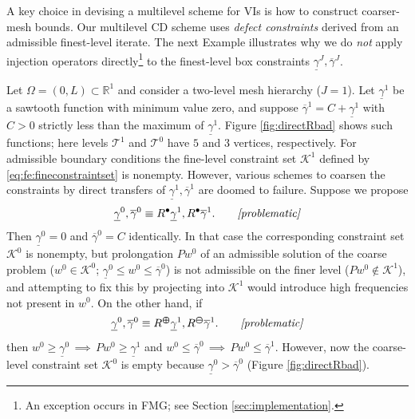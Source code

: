 \documentclass[review,hidelinks,onefignum,onetabnum]{siamart220329}
\newcommand{\RR}{\mathbb{R}}
\newcommand{\maxR}{R^{\bm{\oplus}}}
\newcommand{\minR}{R^{\bm{\ominus}}}
\newcommand{\iR}{R^{\bullet}}
\begin{document}
A key choice in devising a multilevel scheme for VIs is how to construct coarser-mesh bounds.
Our multilevel CD scheme uses \emph{defect constraints} \cite{GraeserKornhuber2009} derived from an admissible finest-level iterate.  The next Example illustrates why we do \emph{not} apply injection operators directly\footnote{An exception occurs in FMG; see Section \ref{sec:implementation}.} to the finest-level box constraints $\underline{\gamma}^J,\overline{\gamma}^J$.

\begin{example}  \label{ex:directRbad}  
Let $\Omega = (0,L) \subset \RR^1$ and consider a two-level mesh hierarchy ($J=1$).  Let $\underline{\gamma}^1$ be a sawtooth function with minimum value zero, and suppose $\overline{\gamma}^1=C+\underline{\gamma}^1$ with $C>0$ strictly less than the maximum of $\underline{\gamma}^1$.  Figure \ref{fig:directRbad} shows such functions; here levels $\mathcal{T}^1$ and $\mathcal{T}^0$ have $5$ and $3$ vertices, respectively.  For admissible boundary conditions the fine-level constraint set $\mathcal{K}^1$ defined by \eqref{eq:fe:fineconstraintset} is nonempty.  However, various schemes to coarsen the constraints by direct transfers of $\underline{\gamma}^1,\overline{\gamma}^1$ are doomed to failure.  Suppose we propose
\begin{equation}
    \label{eq:fe:badstandard}
    \underline{\gamma}^0, \overline{\gamma}^0 \equiv \iR \underline{\gamma}^1, \iR \overline{\gamma}^1. \qquad \text{\emph{[problematic]}}
\end{equation}
Then $\underline{\gamma}^0=0$ and $\overline{\gamma}^0=C$ identically.  In that case the corresponding constraint set $\mathcal{K}^0$ is nonempty, but prolongation $Pw^0$ of an admissible solution of the coarse problem ($w^0\in\mathcal{K}^0$; $\underline{\gamma}^0 \le w^0 \le \overline{\gamma}^0$) is not admissible on the finer level ($Pw^0 \notin \mathcal{K}^1$), and attempting to fix this by projecting into $\mathcal{K}^1$ would introduce high frequencies not present in $w^0$.  On the other hand, if
\begin{equation}
    \label{eq:fe:badmonotone}
    \underline{\gamma}^0, \overline{\gamma}^0 \equiv \maxR \underline{\gamma}^1, \minR \overline{\gamma}^1. \qquad \text{\emph{[problematic]}}
\end{equation}
then $w^0 \ge \underline{\gamma}^0 \, \implies \, Pw^0 \ge \underline{\gamma}^1$ and $w^0 \le \overline{\gamma}^0 \, \implies \, Pw^0 \le \overline{\gamma}^1$.  However, now the coarse-level constraint set $\mathcal{K}^0$ is empty because $\underline{\gamma}^0 > \overline{\gamma}^0$ (Figure \ref{fig:directRbad}).
\end{example}
\end{document}
